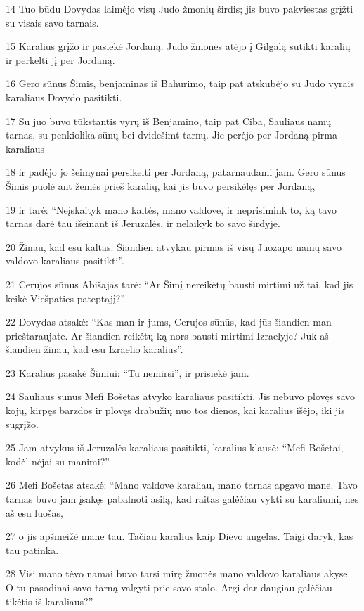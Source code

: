 \par 14 Tuo būdu Dovydas laimėjo visų Judo žmonių širdis; jis buvo pakviestas grįžti su visais savo tarnais. 
\par 15 Karalius grįžo ir pasiekė Jordaną. Judo žmonės atėjo į Gilgalą sutikti karalių ir perkelti jį per Jordaną. 
\par 16 Gero sūnus Šimis, benjaminas iš Bahurimo, taip pat atskubėjo su Judo vyrais karaliaus Dovydo pasitikti. 
\par 17 Su juo buvo tūkstantis vyrų iš Benjamino, taip pat Ciba, Sauliaus namų tarnas, su penkiolika sūnų bei dvidešimt tarnų. Jie perėjo per Jordaną pirma karaliaus 
\par 18 ir padėjo jo šeimynai persikelti per Jordaną, patarnaudami jam. Gero sūnus Šimis puolė ant žemės prieš karalių, kai jis buvo persikėlęs per Jordaną, 
\par 19 ir tarė: “Neįskaityk mano kaltės, mano valdove, ir neprisimink to, ką tavo tarnas darė tau išeinant iš Jeruzalės, ir nelaikyk to savo širdyje. 
\par 20 Žinau, kad esu kaltas. Šiandien atvykau pirmas iš visų Juozapo namų savo valdovo karaliaus pasitikti”. 
\par 21 Cerujos sūnus Abišajas tarė: “Ar Šimį nereikėtų bausti mirtimi už tai, kad jis keikė Viešpaties pateptąjį?” 
\par 22 Dovydas atsakė: “Kas man ir jums, Cerujos sūnūs, kad jūs šiandien man prieštaraujate. Ar šiandien reikėtų ką nors bausti mirtimi Izraelyje? Juk aš šiandien žinau, kad esu Izraelio karalius”. 
\par 23 Karalius pasakė Šimiui: “Tu nemirsi”, ir prisiekė jam. 
\par 24 Sauliaus sūnus Mefi Bošetas atvyko karaliaus pasitikti. Jis nebuvo plovęs savo kojų, kirpęs barzdos ir plovęs drabužių nuo tos dienos, kai karalius išėjo, iki jis sugrįžo. 
\par 25 Jam atvykus iš Jeruzalės karaliaus pasitikti, karalius klausė: “Mefi Bošetai, kodėl nėjai su manimi?” 
\par 26 Mefi Bošetas atsakė: “Mano valdove karaliau, mano tarnas apgavo mane. Tavo tarnas buvo jam įsakęs pabalnoti asilą, kad raitas galėčiau vykti su karaliumi, nes aš esu luošas, 
\par 27 o jis apšmeižė mane tau. Tačiau karalius kaip Dievo angelas. Taigi daryk, kas tau patinka. 
\par 28 Visi mano tėvo namai buvo tarsi mirę žmonės mano valdovo karaliaus akyse. O tu pasodinai savo tarną valgyti prie savo stalo. Argi dar daugiau galėčiau tikėtis iš karaliaus?” 
